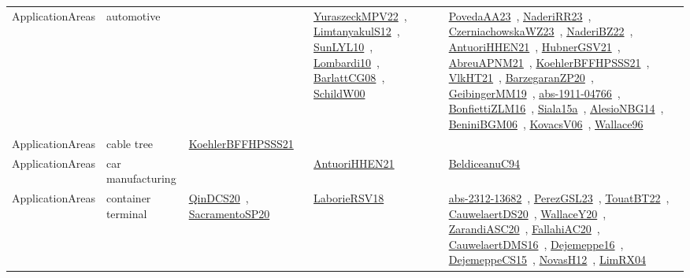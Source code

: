 {\begin{longtable}{lp{3cm}>{\raggedright\arraybackslash}p{6cm}>{\raggedright\arraybackslash}p{6cm}>{\raggedright\arraybackslash}p{8cm}}
ApplicationAreas & automotive &  & \href{works/YuraszeckMPV22.pdf}{YuraszeckMPV22}~\cite{YuraszeckMPV22}, \href{works/LimtanyakulS12.pdf}{LimtanyakulS12}~\cite{LimtanyakulS12}, \href{works/SunLYL10.pdf}{SunLYL10}~\cite{SunLYL10}, \href{works/Lombardi10.pdf}{Lombardi10}~\cite{Lombardi10}, \href{works/BarlattCG08.pdf}{BarlattCG08}~\cite{BarlattCG08}, \href{works/SchildW00.pdf}{SchildW00}~\cite{SchildW00} & \href{works/PovedaAA23.pdf}{PovedaAA23}~\cite{PovedaAA23}, \href{works/NaderiRR23.pdf}{NaderiRR23}~\cite{NaderiRR23}, \href{works/CzerniachowskaWZ23.pdf}{CzerniachowskaWZ23}~\cite{CzerniachowskaWZ23}, \href{works/NaderiBZ22.pdf}{NaderiBZ22}~\cite{NaderiBZ22}, \href{works/AntuoriHHEN21.pdf}{AntuoriHHEN21}~\cite{AntuoriHHEN21}, \href{works/HubnerGSV21.pdf}{HubnerGSV21}~\cite{HubnerGSV21}, \href{works/AbreuAPNM21.pdf}{AbreuAPNM21}~\cite{AbreuAPNM21}, \href{works/KoehlerBFFHPSSS21.pdf}{KoehlerBFFHPSSS21}~\cite{KoehlerBFFHPSSS21}, \href{works/VlkHT21.pdf}{VlkHT21}~\cite{VlkHT21}, \href{works/BarzegaranZP20.pdf}{BarzegaranZP20}~\cite{BarzegaranZP20}, \href{works/GeibingerMM19.pdf}{GeibingerMM19}~\cite{GeibingerMM19}, \href{works/abs-1911-04766.pdf}{abs-1911-04766}~\cite{abs-1911-04766}, \href{works/BonfiettiZLM16.pdf}{BonfiettiZLM16}~\cite{BonfiettiZLM16}, \href{works/Siala15a.pdf}{Siala15a}~\cite{Siala15a}, \href{works/AlesioNBG14.pdf}{AlesioNBG14}~\cite{AlesioNBG14}, \href{works/BeniniBGM06.pdf}{BeniniBGM06}~\cite{BeniniBGM06}, \href{works/KovacsV06.pdf}{KovacsV06}~\cite{KovacsV06}, \href{works/Wallace96.pdf}{Wallace96}~\cite{Wallace96}\\
ApplicationAreas & cable tree & \href{works/KoehlerBFFHPSSS21.pdf}{KoehlerBFFHPSSS21}~\cite{KoehlerBFFHPSSS21} &  & \\
ApplicationAreas & car manufacturing &  & \href{works/AntuoriHHEN21.pdf}{AntuoriHHEN21}~\cite{AntuoriHHEN21} & \href{works/BeldiceanuC94.pdf}{BeldiceanuC94}~\cite{BeldiceanuC94}\\
ApplicationAreas & container terminal & \href{works/QinDCS20.pdf}{QinDCS20}~\cite{QinDCS20}, \href{works/SacramentoSP20.pdf}{SacramentoSP20}~\cite{SacramentoSP20} & \href{works/LaborieRSV18.pdf}{LaborieRSV18}~\cite{LaborieRSV18} & \href{works/abs-2312-13682.pdf}{abs-2312-13682}~\cite{abs-2312-13682}, \href{works/PerezGSL23.pdf}{PerezGSL23}~\cite{PerezGSL23}, \href{works/TouatBT22.pdf}{TouatBT22}~\cite{TouatBT22}, \href{works/CauwelaertDS20.pdf}{CauwelaertDS20}~\cite{CauwelaertDS20}, \href{works/WallaceY20.pdf}{WallaceY20}~\cite{WallaceY20}, \href{works/ZarandiASC20.pdf}{ZarandiASC20}~\cite{ZarandiASC20}, \href{works/FallahiAC20.pdf}{FallahiAC20}~\cite{FallahiAC20}, \href{works/CauwelaertDMS16.pdf}{CauwelaertDMS16}~\cite{CauwelaertDMS16}, \href{works/Dejemeppe16.pdf}{Dejemeppe16}~\cite{Dejemeppe16}, \href{works/DejemeppeCS15.pdf}{DejemeppeCS15}~\cite{DejemeppeCS15}, \href{works/NovasH12.pdf}{NovasH12}~\cite{NovasH12}, \href{works/LimRX04.pdf}{LimRX04}~\cite{LimRX04}\\

\end{longtable}}
